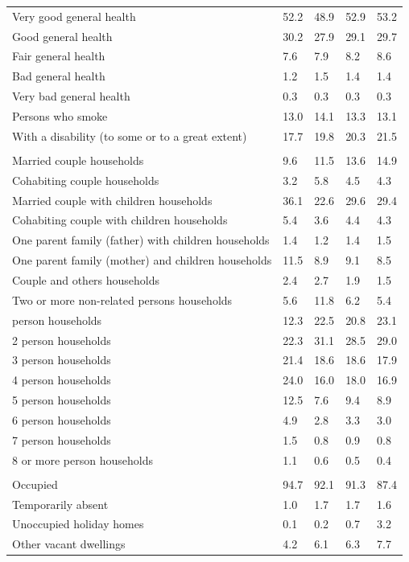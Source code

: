 \documentclass{article}
\begin{document}
\begin{table}[h]
\begin{tabular}{KTTTT}
    \hline
Very good general health & 52.2& 48.9&52.9& 53.2\\
Good general health & 30.2& 27.9& 29.1& 29.7\\
Fair general health & 7.6& 7.9&8.2& 8.6\\
Bad general health & 1.2& 1.5&1.4& 1.4\\
Very bad general health & 0.3& 0.3&0.3& 0.3\\
    \hline
Persons who smoke & 13.0& 14.1&13.3& 13.1\\
    \hline
With a disability (to some or to a great extent) & 17.7& 19.8&20.3& 21.5\\
\hline
    \\ 
    \hline
Married couple households &  9.6& 11.5& 13.6& 14.9\\
Cohabiting couple households & 3.2& 5.8& 4.5& 4.3\\
Married couple with children households & 36.1& 22.6& 29.6& 29.4\\
Cohabiting couple with children households & 5.4& 3.6& 4.4& 4.3\\
One parent family (father) with  children households & 1.4& 1.2& 1.4& 1.5\\
One parent family (mother) and children households & 11.5&  8.9&  9.1&  8.5\\
Couple and others households  & 2.4& 2.7& 1.9& 1.5\\
Two or more non-related persons households &  5.6& 11.8&  6.2&  5.4\\
     person households & 12.3& 22.5& 20.8& 23.1\\
2 person households & 22.3& 31.1& 28.5& 29.0\\
3 person households & 21.4& 18.6& 18.6& 17.9\\
4 person households & 24.0& 16.0& 18.0& 16.9\\
5 person households & 12.5&  7.6&  9.4&  8.9\\
6 person households & 4.9& 2.8& 3.3& 3.0\\
7 person households & 1.5& 0.8& 0.9& 0.8\\
8 or more person households & 1.1& 0.6& 0.5& 0.4\\
\hline
    \\ 
    \hline
Occupied & 94.7& 92.1& 91.3& 87.4\\
Temporarily absent & 1.0& 1.7& 1.7& 1.6\\
Unoccupied holiday homes & 0.1& 0.2& 0.7& 3.2\\
Other vacant dwellings & 4.2& 6.1& 6.3& 7.7\\
\hline
\end{tabular}
\end{table}
\end{document}

